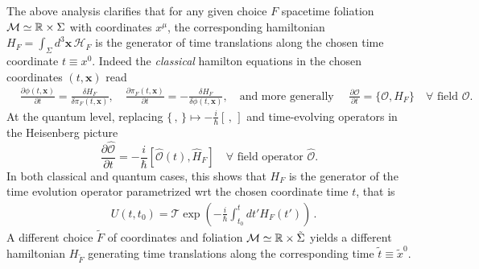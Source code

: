 \documentclass[../QFT_main.tex]{subfiles}
\begin{document}
\begin{mytheorem}
%
The above analysis clarifies that for any given choice $F$ spacetime foliation $\mathcal{M}\simeq \mathbb{R}\times \Sigma$ with coordinates $x^\mu$, the corresponding hamiltonian $H_F=\int_\Sigma d^3\mathbf{x}\,\mathcal{H}_F$  is the generator of time translations along the chosen time coordinate $t\equiv x^0$.
Indeed the \emph{classical} hamilton equations in the chosen coordinates $(t,\mathbf{x})$ read
\begin{align}
  &\frac{\partial \phi(t,\mathbf{x})}{\partial t} = \frac{\delta H_F}{\delta \pi_F(t,\mathbf{x})}, \quad
  \frac{\partial \pi_F(t,\mathbf{x})}{\partial t} = -\frac{\delta H_F}{\delta \phi(t,\mathbf{x})},\quad\text{and more generally }\quad \frac{\partial \mathcal{O}}{\partial t} = \{\mathcal{O}, H_F\}\quad \forall\,\, \text{field}\,\,\mathcal{O}.
\end{align}
At the quantum level, replacing $\{\,,\,\}\mapsto -\frac{i}{\hbar}[\,,\,]$ and time-evolving operators in the Heisenberg picture
\begin{equation}
  \frac{\partial \hat{\mathcal{O}}}{\partial t} = -\frac{i}{\hbar} [\hat{\mathcal{O}}(t), \hat{H}_F]\quad \forall \,\,\text{field operator}\,\, \hat{\mathcal{O}}.
\end{equation}
In both classical and quantum cases, this shows that $H_F$ is the generator of the time evolution operator parametrized wrt the chosen coordinate time $t$, that is
\begin{align}
  &U(t,t_0) = \mathcal{T}\exp\left(-\frac{i}{\hbar}\int_{t_0}^t \!\! dt' H_F(t')\right)\,.
\end{align}
A different choice $\tilde{F}$ of coordinates and foliation  $\mathcal{M}\simeq \mathbb{R}\times \tilde{\Sigma}$ yields a different hamiltonian $H_{\tilde{F}}$ generating time translations along the corresponding time $\tilde{t}\equiv \tilde{x}^0$.


\end{mytheorem}
\end{document}
